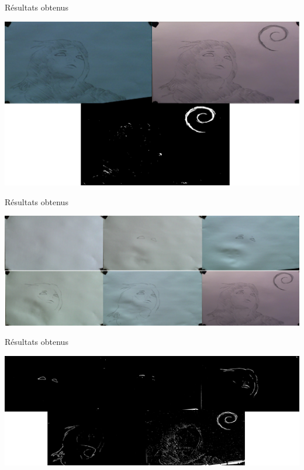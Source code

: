 \documentclass[t,14pt]{beamer}
\begin{document}
\begin{frame}{Résultats obtenus}
\vspace{5mm}
\begin{center}
\includegraphics[width=\textwidth]{images/evo/masque.png}
\end{center}
\end{frame}


\begin{frame}{Résultats obtenus}
\vspace{5mm}
\begin{center}
\includegraphics[width=\textwidth]{images/evo/evo.png}
\end{center}
\end{frame}
\begin{frame}{Résultats obtenus}
\vspace{5mm}
\begin{center}
\includegraphics[width=\textwidth]{images/evo/evomasque.png}
\end{center}
\end{frame}
			
\end{document}
